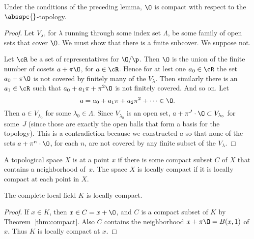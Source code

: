 \documentclass[11pt]{book}
\begin{document}
\begin{ch}
\begin{example}
\end{example}

\begin{theorem}\label{thm:compact}
Under the conditions of the preceding lemma, $\O$ is compact with
respect to the $\absspc{}$-topology.
\end{theorem}
\begin{proof}
  Let $V_\lambda$, for $\lambda$ running through some index set
  $\Lambda$, be some family of open sets that cover $\O$.  We must
  show that there is a finite subcover.  We suppose not.

  Let $\cR$ be a set of representatives for $\O/\p$.  Then $\O$ is the
  union of the finite number of cosets $a+\pi\O$, for $a\in \cR$.
    Hence for at lest one $a_0\in \cR$ the set $a_0+\pi \O$
    is not covered by finitely many of the $V_\lambda$.  Then similarly
  there is an $a_1\in \cR$ such that $a_0 + a_1\pi + \pi^2\O$ is not
  finitely covered. And so on.  Let
  $$
  a = a_0 + a_1\pi + a_2 \pi^2 + \cdots \in \O.
  $$
  Then $a\in V_{\lambda_0}$ for some $\lambda_0\in\Lambda$.  Since
  $V_{\lambda_0}$ is an open set, $a+\pi^J\cdot \O\subset
  V_{\lambda_0}$ for some~$J$ (since those are exactly the open balls
  that form a basis for the topology). This is a contradiction because
  we constructed $a$ so that none of the sets $a+\pi^n\cdot \O$, for
  each $n$, are not covered by any finite subset of the $V_{\lambda}$.
\end{proof}

\begin{definition}
  A topological space $X$ is  at a point $x$ if
  there is some compact subset $C$ of $X$ that contains a neighborhood
  of~$x$.  The space $X$ is locally compact if it is locally compact
  at each point in $X$.
\end{definition}
\begin{corollary}\label{cor:locally_compact}
The complete local field $K$ is locally compact.
\end{corollary}
\begin{proof}
  If $x\in K$, then $x \in C=x+\O$, and $C$ is a compact subset of $K$
  by Theorem~\ref{thm:compact}.  Also $C$ contains the neighborhood
  $x+\pi\O = B(x,1)$ of $x$.  Thus $K$ is locally compact at $x$.
\end{proof}


\end{ch}
\end{document}
